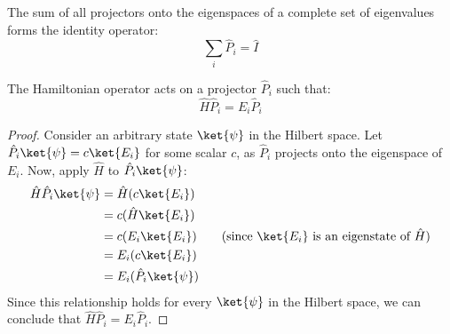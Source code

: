 \begin{definition}
    The sum of all projectors onto the eigenspaces of a complete set
    of eigenvalues forms the identity operator:
    \begin{equation} \label{eq:completeness_relation}
        \sum_i \hat P_i = \hat I
    \end{equation}
\end{definition}

\begin{lemma}
    The Hamiltonian operator acts on a projector $\hat P_i$ such that:
    \begin{equation} \label{eq:H_P_i_relation}
        \hat H \hat P_i = E_i \hat P_i
    \end{equation}
\end{lemma}
\begin{proof}
    Consider an arbitrary state $\ket{\psi}$ in the Hilbert space.
    Let $\hat P_i \ket{\psi} = c \ket{E_i}$ for some scalar $c$, as
    $\hat P_i$ projects onto the eigenspace of $E_i$.
    Now, apply $\hat H$ to $\hat P_i \ket{\psi}$:
    \begin{align} \label{eq:H_P_i_proof}
        \hat H \hat P_i \ket{\psi} &= \hat H (c \ket{E_i}) \\
        &= c (\hat H \ket{E_i}) \notag \\
        &= c (E_i \ket{E_i}) \quad &\text{(since } \ket{E_i} \text{
        is an eigenstate of } \hat H \text{)} \notag \\
        &= E_i (c \ket{E_i}) \notag \\
        &= E_i (\hat P_i \ket{\psi}) \notag
    \end{align}
    Since this relationship holds for every $\ket{\psi}$ in the
    Hilbert space, we can conclude that $\hat H \hat P_i = E_i \hat P_i$.
\end{proof}

